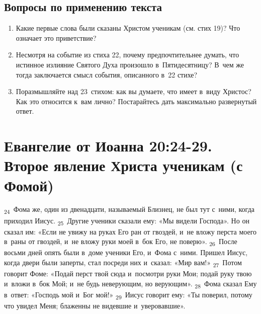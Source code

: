 \documentclass[a4paper,12pt]{article}
\begin{document}
\subsection*{Вопросы по применению текста} 
\begin{enumerate}
    \item Какие первые слова были сказаны Христом ученикам (см. стих 19)? Что означает это приветствие? 
    
    \myline
    
    \myline
    \item Несмотря на событие из стиха 22, почему предпочтительнее думать, что истинное излияние Святого Духа произошло в~Пятидесятницу? В~чем же тогда заключается смысл события, описанного в~22 стихе? 
    
    \myline
    
    \myline
    \item Поразмышляйте над 23~стихом: как вы думаете, что имеет в~виду Христос? Как это относится к~вам лично? Постарайтесь дать максимально развернутый ответ. 
    
    \myline
    
    \myline
\end{enumerate}



\section{Евангелие от Иоанна 20:24-29. Второе явление Христа ученикам (с Фомой)} 

 \textsubscript{24}~Фома же, один из двенадцати, называемый Близнец, не был тут с~ними, когда приходил Иисус. \textsubscript{25}~Другие ученики сказали ему: «Мы видели Господа». Но он сказал им: «Если не увижу на руках Его ран от гвоздей, и~не вложу перста моего в~раны от гвоздей, и~не вложу руки моей в~бок Его, не поверю». \textsubscript{26}~После восьми дней опять были в~доме ученики Его, и~Фома с~ними. Пришел Иисус, когда двери были заперты, стал посреди них и~сказал: «Мир вам!» \textsubscript{27}~Потом говорит Фоме: «Подай перст твой сюда и~посмотри руки Мои; подай руку твою и~вложи в~бок Мой; и~не будь неверующим, но верующим». \textsubscript{28}~Фома сказал Ему в~ответ: «Господь мой и~Бог мой!» \textsubscript{29}~Иисус говорит ему: «Ты поверил, потому что увидел Меня; блаженны не видевшие и~уверовавшие».
\end{document}

